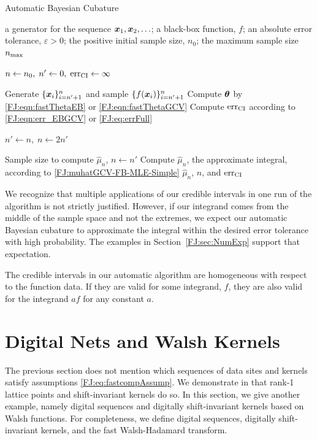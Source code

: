 \documentclass[graybox,footinfo]{svmult}
\begin{document}
\begin{algorithm}
	\caption{Automatic Bayesian Cubature}\label{FJ:algorithm1}
	\begin{algorithmic}[1]
		\Require a generator for the sequence
		${\boldsymbol{x}}_1, {\boldsymbol{x}}_2, \ldots$; 
		a black-box function, $f$; 
		an absolute error tolerance,
		$\varepsilon>0$; the positive initial sample size, $n_0$;
		the maximum sample size $n_{\textup{max}}$
		
		\State $n \gets n_0, \; n' \gets 0, \; \textup{err}_\textup{CI} \gets \infty$
		
		\State Generate $\{ {\boldsymbol{x}}_i\}_{i=n' + 1}^{n}$ and sample $\{f({\boldsymbol{x}}_i)\}_{i=n'+1}^{n}$
		\State Compute ${\boldsymbol{\theta}}$ by \eqref{FJ:eqn:fastThetaEB} or \eqref{FJ:eqn:fastThetaGCV}
		\State Compute $\textup{err}_\textup{CI}$  according to \eqref{FJ:eqn:err_EBGCV} or \eqref{FJ:eq:errFull}
		
		\State	$n' \gets n, \; n \gets 2n'$
		
		\EndWhile
		
		\State Sample size to compute $\widehat{\mu}_n$, $n \gets n'$
		\State Compute $\widehat{\mu}_n$, the approximate integral, according to \eqref{FJ:muhatGCV-FB-MLE-Simple}
		\State \Return $\widehat{\mu}_n$, $n$,  and $\textup{err}_\textup{CI}$
	\end{algorithmic}
\end{algorithm}

We recognize that multiple applications of our credible intervals in one run of the algorithm is not strictly justified.  However, if our integrand comes from the middle of the sample space  and not the extremes, we expect our automatic Bayesian cubature to approximate the integral within the desired error tolerance with high probability. The examples in Section~\ref{FJ:sec:NumExp} support that expectation. 

The credible intervals in our automatic algorithm are homogeneous with respect to the function data.  If they are valid for some integrand, $f$, they are also valid for the integrand $a f$ for any constant $a$.  





\section{Digital Nets and Walsh Kernels}
\label{FJ:sec:sobol_walsh}


The previous section does not mention which sequences of data sites and  kernels satisfy assumptions \eqref{FJ:eq:fastcompAssump}.  We demonstrate in \cite{RatHic19a} that rank-1 lattice points and shift-invariant kernels do so.  In this section, we give another example, namely digital sequences and digitally shift-invariant kernels based on Walsh functions.  For completeness, we define digital sequences, digitally shift-invariant kernels, and the fast Walsh-Hadamard transform.
\end{document}

